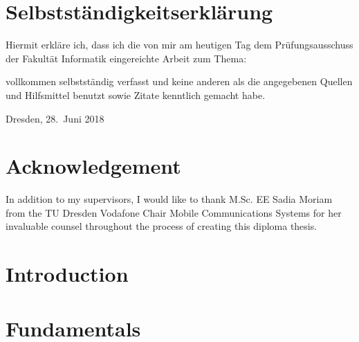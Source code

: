 \documentclass[
	paper=a4,
	fontsize=11pt,
	parskip=full %
]{scrreprt}
\begin{document}
    \chapter*{Selbstständigkeitserklärung}
    Hiermit erkläre ich, dass ich die von mir am heutigen Tag dem Prüfungsausschuss der Fakultät Informatik eingereichte Arbeit zum Thema:
    \begin{adjustwidth}{0.15\textwidth}{0.15\textwidth}
        \begin{center}
            \textit{\thetitle}
        \end{center}
    \end{adjustwidth}

    vollkommen selbstständig verfasst und keine anderen als die angegebenen Quellen und Hilfsmittel benutzt sowie Zitate kenntlich gemacht habe.

    \vspace{0.5\baselineskip}
    Dresden, 28.\ Juni 2018 \\

    \vspace{2\baselineskip}
    \theauthor

	\chapter*{Acknowledgement}
    In addition to my supervisors, I would like to thank M.Sc. EE Sadia Moriam from the TU Dresden Vodafone Chair Mobile Communications Systems for
    her invaluable counsel throughout the process of creating this diploma thesis.
	
	\tableofcontents
	
	
	\listoftables
	\vspace{-2.6\baselineskip}
	\begingroup
	\let\clearpage\relax
	\listoffigures
	\endgroup
	
	
	\chapter{Introduction}\label{ch:introduction}
    
    
    \chapter{Fundamentals}\label{ch:fundamentals}
    
\end{document}
